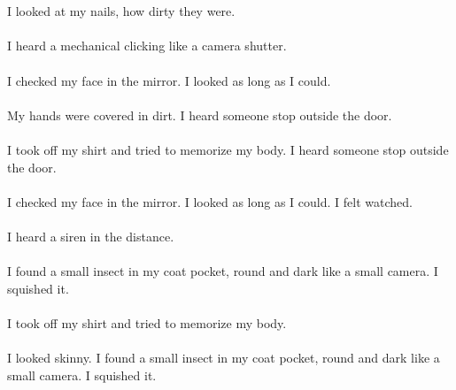 \documentclass{article}
\begin{document}
    \section{}
    I looked at my nails, how dirty they were. \\\\I heard a mechanical clicking like a camera shutter. \\\\I checked my face in the mirror. I looked as long as I could. \\\\My hands were covered in dirt. I heard someone stop outside the door. \\\\I took off my shirt and tried to memorize my body. I heard someone stop outside the door. \\\\I checked my face in the mirror. I looked as long as I could. I felt watched. \\\\I heard a siren in the distance. \\\\I found a small insect in my coat pocket, round and dark like a small camera. I squished it. \\\\I took off my shirt and tried to memorize my body. \\\\I looked skinny. I found a small insect in my coat pocket, round and dark like a small camera. I squished it. \\\\
    \newpage
    
\end{document}
